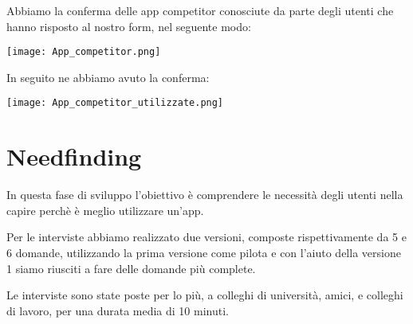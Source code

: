 \documentclass{article}
\begin{document}
Abbiamo la conferma delle app competitor conosciute da parte degli utenti che hanno risposto al nostro form, nel seguente modo:
\begin{center}
   \texttt{[image: App\_competitor.png]} 
\end{center}
\par In seguito ne abbiamo avuto la conferma:
\begin{center}
    \texttt{[image: App\_competitor\_utilizzate.png]}
\end{center}


    \vspace{1cm}
\section{Needfinding} 
In questa fase di sviluppo l’obiettivo è comprendere le necessità degli utenti nella capire perchè è meglio utilizzare un'app.
    \vspace{1cm}
     \par
\par Per le interviste abbiamo realizzato due versioni, composte rispettivamente da 5 e 6 domande, utilizzando la prima versione come pilota e con l'aiuto della versione 1 siamo riusciti a fare delle domande più complete. \par Le interviste sono state poste per lo più, a colleghi di università, amici, e colleghi di lavoro, per una durata media di 10 minuti.\par
  \vspace{1cm}
\par{}
\end{document}

